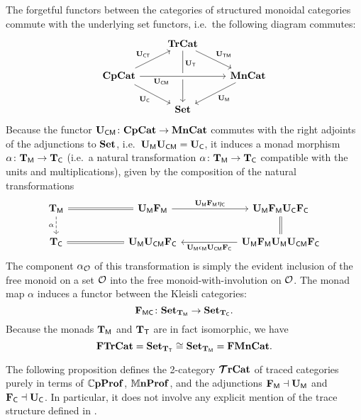 \documentclass[11pt,oneside,article]{memoir}
\begin{document}
The forgetful functors between the categories of structured monoidal categories commute with the
underlying set functors, i.e.\ the following diagram commutes:
\begin{equation}
    \label{eqn:tetrahedron}
  \begin{tikzcd}
    & \TrCat \ar[dr,"\UTM"] \ar[dd,"\UT" near start] & \\
    \CompCat \ar[rr,crossing over,"\UCM"' near start] \ar[dr,"\UC"'] \ar[ru,"\UCT"]
      && \MonCat \ar[dl,"\UM"] \\
    & \Set &
  \end{tikzcd}
\end{equation}
Because the functor $\mathbf{U}_{\mathsf{CM}}\colon\mathbf{CpCat}\to\mathbf{MnCat}$ commutes with the right adjoints of the
adjunctions to $\mathbf{Set}$, i.e.\ $\mathbf{U}_{\mathsf{M}}\mathbf{U}_{\mathsf{CM}}=\mathbf{U}_{\mathsf{C}}$, it induces a monad morphism $\alpha\colon\mathbf{T}_{\mathsf{M}}\to\mathbf{T}_{\mathsf{C}}$
(i.e.\ a natural transformation $\alpha\colon\mathbf{T}_{\mathsf{M}}\to\mathbf{T}_{\mathsf{C}}$ compatible with the units and
multiplications), given by the composition of the natural transformations
\begin{equation*} \begin{tikzcd}[column sep=2cm]
  \TM \ar[r,equal] \ar[d,dashed,"\alpha"']
    & \UM\FM \ar[r,"\UM\FM\eta_{\MTCfont{C}}"]
    & \UM\FM\UC\FC \ar[d,equal] \\
  \TC
    & \UM\UCM\FC \ar[l,equal]
    & \UM\FM\UM\UCM\FC \ar[l,"\UM\epsilon_{\MTCfont{M}}\UCM\FC"]
\end{tikzcd} \end{equation*}
The component $\alpha_{\mathcal{O}}$ of this transformation is simply the evident inclusion of the free
monoid on a set $\mathcal{O}$ into the free monoid-with-involution on $\mathcal{O}$. The monad map $\alpha$
induces a functor between the Kleisli categories:
\begin{equation*}
    \label{eqn:FMC}
  \mathbf{F}_{\mathsf{MC}}\colon\mathbf{Set}_{\mathbf{T}_{\mathsf{M}}}\to\mathbf{Set}_{\mathbf{T}_{\mathsf{C}}}.
\end{equation*}
Because the monads $\mathbf{T}_{\mathsf{M}}$ and $\mathbf{T}_{\mathsf{T}}$ are in fact isomorphic, we have
\[
  \mathbf{FTrCat} = \mathbf{Set}_{\mathbf{T}_{\mathsf{T}}} \cong \mathbf{Set}_{\mathbf{T}_{\mathsf{M}}} = \mathbf{FMnCat}.
\]

The following proposition defines the 2-category $\bm{\mathcal{T}}\mathbf{rCat}$ of traced categories purely in terms of
$\mathbb{C}\mathbf{pProf}$, $\mathbb{M}\mathbf{nProf}$, and the adjunctions $\mathbf{F}_{\mathsf{M}}\dashv\mathbf{U}_{\mathsf{M}}$ and $\mathbf{F}_{\mathsf{C}}\dashv\mathbf{U}_{\mathsf{C}}$. In particular, it
does not involve any explicit mention of the trace structure defined in \cite{JoyalStreetVerity}.
\end{document}
